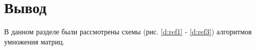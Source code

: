 \begin{figure}[ht!]
\end{figure}

\section{Вывод}

В данном разделе были рассмотрены схемы (рис. \ref{d:ref1} - \ref{d:ref3}) алгоритмов умножения матриц.